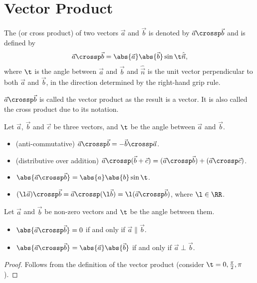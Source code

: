 \section{Vector Product}

\begin{definition}
    The  (or cross product) of two vectors $\vec a$ and $\vec b$ is denoted by $\vec a \crossp \vec b$ and is defined by \[\vec a \crossp \vec b = \abs{\vec a}\abs{\vec b} \sin \t \hat{\vec n},\] where $\t$ is the angle between $\vec a$ and $\vec b$ and $\hat{\vec n}$ is the unit vector perpendicular to both $\vec a$ and $\vec b$, in the direction determined by the right-hand grip rule.
\end{definition}
\begin{remark}
    $\vec a \crossp \vec b$ is called the vector product as the result is a vector. It is also called the cross product due to its notation.
\end{remark}

\begin{fact}
    Let $\vec a$, $\vec b$ and $\vec c$ be three vectors, and $\t$ be the angle between $\vec a$ and $\vec b$.
    \begin{itemize}
        \item (anti-commutative) $\vec a \crossp \vec b = -\vec b \crossp \vec a$.
        \item (distributive over addition) $\vec a \crossp (\vec b + \vec c) = (\vec a \crossp \vec b) + (\vec a \crossp \vec c)$.
        \item $\abs{\vec a \crossp \vec b} = \abs{a} \abs{b} \sin \t$.
        \item $(\l \vec a) \crossp \vec b = \vec a \crossp (\l \vec b) = \l (\vec a \crossp \vec b)$, where $\l \in \RR$.
    \end{itemize}
\end{fact}

\begin{proposition}
    Let $\vec a$ and $\vec b$ be non-zero vectors and $\t$ be the angle between them.
    \begin{itemize}
        \item $\abs{\vec a \crossp \vec b} = 0$ if and only if $\vec a \parallel \vec b$.
        \item $\abs{\vec a \crossp \vec b} = \abs{\vec a} \abs{\vec b}$ if and only if $\vec a \perp \vec b$.
    \end{itemize}
\end{proposition}
\begin{proof}
    Follows from the definition of the vector product (consider $\t = 0, \frac\pi2, \pi$).
\end{proof}

